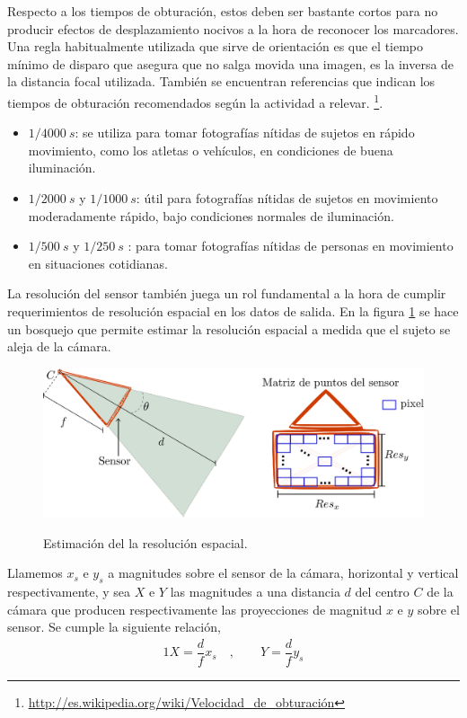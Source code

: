 Respecto a los tiempos de obturación, estos deben ser bastante cortos  para no producir efectos de desplazamiento nocivos a la hora de reconocer los marcadores.
Una regla habitualmente utilizada que sirve de orientación es que el tiempo mínimo de disparo que asegura que no salga movida una imagen, es la inversa de la distancia focal utilizada. También se encuentran referencias que indican los tiempos de obturación recomendados según la actividad a relevar. \footnote{\textcolor{blue}{\underline{\url{http://es.wikipedia.org/wiki/Velocidad_de_obturación}}}}.
\begin{itemize}
\item $1 / 4000~ s$:  se utiliza para tomar fotografías nítidas de sujetos en rápido movimiento, como los atletas o vehículos, en condiciones de buena iluminación.
\item $1 / 2000 ~s$ y $1/ 1000~s$: útil  para fotografías nítidas de sujetos en movimiento moderadamente rápido, bajo condiciones normales de iluminación.
\item $1 / 500~s$ y $1/ 250~s$ :  para tomar fotografías nítidas de personas en movimiento en situaciones cotidianas.
\end{itemize}
 
 
 La resolución del sensor también juega un rol fundamental a la hora de cumplir requerimientos de resolución espacial en los datos de salida.
 En la figura \ref{estimacion_resolucion} se hace un bosquejo que permite estimar la resolución espacial a medida que el sujeto se aleja de la cámara.
 
\begin{figure}[H]
  \centering
  {\includegraphics[scale=0.5]{img/Base_Datos/camara_resolucion.eps}\label{peladoOriginalintro}}      
  \caption{Estimación del la resolución espacial.}
  \label{estimacion_resolucion}
\end{figure} 

Llamemos $x_s$ e $y_s$ a magnitudes sobre el sensor de la cámara, horizontal y vertical respectivamente, y sea $X$ e $Y$ las magnitudes a una distancia $d$ del centro $C$ de la cámara que producen respectivamente las proyecciones de magnitud $x$ e $y$ sobre el sensor.
Se cumple la siguiente relación,
\begin{alignat*}{1}
X = \dfrac{d}{f}x_s&~, \quad \quad Y = \dfrac{d}{f}y_s
\end{alignat*}

